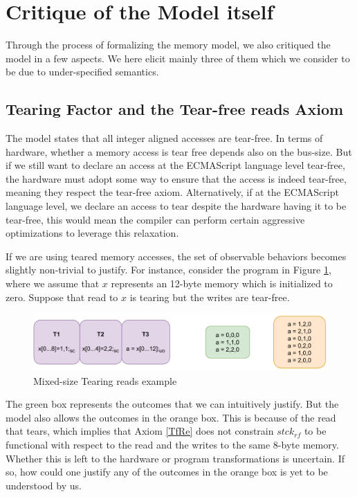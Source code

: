 \section{Critique of the Model itself}

    Through the process of formalizing the memory model, we also critiqued the model in a few aspects. 
    We here elicit mainly three of them which we consider to be due to under-specified semantics.

    \subsection{Tearing Factor and the Tear-free reads Axiom}

        The model states that all integer aligned accesses are tear-free.  
        In terms of hardware, whether a memory access is tear free depends also on the bus-size.
        But if we still want to declare an access at the ECMAScript language level tear-free, the hardware must adopt some way to ensure that the access is indeed tear-free, meaning they respect the tear-free axiom.
        Alternatively, if at the ECMAScript language level, we declare an access to tear despite the hardware having it to be tear-free, this would mean the compiler can perform certain aggressive optimizations to leverage this relaxation. 

        If we are using teared memory accesses, the set of observable behaviors becomes slightly non-trivial to justify.
        For instance, consider the program in Figure \ref{crit:tearing}, where we assume that $x$ represents an 12-byte memory which is initialized to zero. 
        Suppose that read to $x$ is tearing but the writes are tear-free.
        \begin{figure}[H]
            \centering
            \includegraphics[scale=0.7]{6.ConclusionFutureWork/TearingExample.pdf}
            \caption{Mixed-size Tearing reads example}
            \label{crit:tearing}
        \end{figure}

        The green box represents the outcomes that we can intuitively justify.
        But the model also allows the outcomes in the orange box. 
        This is because of the read that tears, which implies that Axiom \ref{TfRe} does not constrain $stck{_{rf}}$ to be functional with respect to the read and the writes to the same 8-byte memory. 
        Whether this is left to the hardware or program transformations is uncertain.
        If so, how could one justify any of the outcomes in the orange box is yet to be understood by us. 

